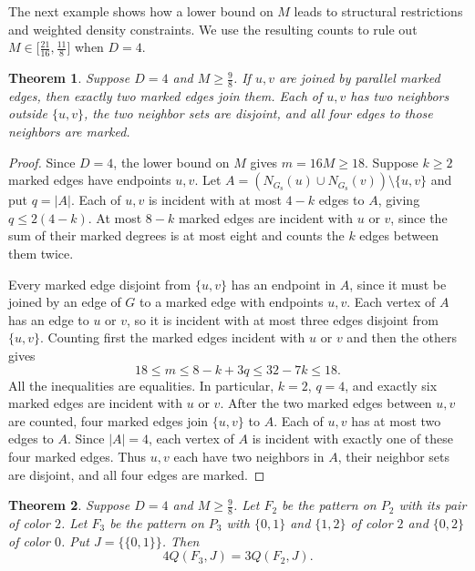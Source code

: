\documentclass[preprint,11pt,numbers]{elsarticle-arxiv}
\numberwithin{equation}{section}
\newtheorem{theorem}{Theorem}[section]
\theoremstyle{definition}
\begin{document}
The next example shows how a lower bound on $M$ leads to structural
restrictions and weighted density constraints. We use the resulting
counts to rule out $M\in\bigl[\frac{21}{16},\frac{11}{8}\bigr]$
when $D=4$.

\begin{theorem}\label{thm:degree-four-marked-edge}
Suppose $D=4$ and $M\geq\frac98$. If $u,v$ are joined by parallel
marked edges, then exactly two marked edges join them. Each of
$u,v$ has two neighbors outside $\{u,v\}$, the two neighbor sets
are disjoint, and all four edges to those neighbors are marked.
\end{theorem}

\begin{proof}
Since $D=4$, the lower bound on $M$ gives $m=16M\geq18$.
Suppose $k\geq2$ marked edges have endpoints $u,v$. Let
$A=(N_{G_{\mathrm s}}(u)\cup N_{G_{\mathrm s}}(v))\setminus\{u,v\}$
and put $q=|A|$. Each of $u,v$ is incident with at most $4-k$
edges to $A$, giving $q\leq2(4-k)$. At most $8-k$ marked
edges are incident with $u$ or $v$, since the sum of their marked
degrees is at most eight and counts the $k$ edges between them
twice.

Every marked edge disjoint from $\{u,v\}$ has an endpoint in $A$,
since it must be joined by an edge of $G$ to a marked edge with
endpoints $u,v$. Each vertex of $A$ has an edge to $u$ or $v$,
so it is incident with at most three edges disjoint from
$\{u,v\}$. Counting first the marked edges incident with $u$
or $v$ and then the others gives
\[
 18\leq m\leq8-k+3q\leq32-7k\leq18.
\]
All the inequalities are equalities. In particular, $k=2$, $q=4$,
and exactly six marked edges are incident with $u$ or $v$. After
the two marked edges between $u,v$ are counted, four marked edges
join $\{u,v\}$ to $A$. Each of $u,v$ has at most two edges to $A$.
Since $|A|=4$, each vertex of $A$ is incident with exactly one
of these four marked edges. Thus $u,v$ each have two neighbors
in $A$, their neighbor sets are disjoint, and all four edges are marked.
\end{proof}

\begin{theorem}\label{thm:degree-four-weighted-densities}
Suppose $D=4$ and $M\geq\frac98$. Let $F_2$ be the pattern on
$P_2$ with its pair of color $2$. Let $F_3$ be the pattern on
$P_3$ with $\{0,1\}$ and $\{1,2\}$ of color $2$ and $\{0,2\}$
of color $0$. Put $J=\{\{0,1\}\}$. Then
\begin{equation}\label{eq:degree-four-weighted-densities}
 4Q(F_3,J)=3Q(F_2,J).
\end{equation}
\end{theorem}
\end{document}
